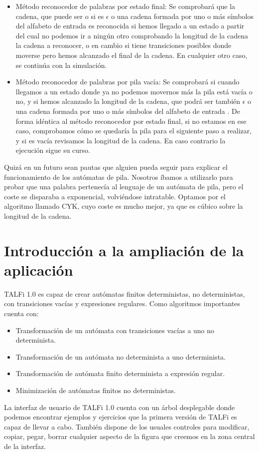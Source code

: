 \documentclass[12pt,a4paper,spanish]{book}
\begin{document}
\begin{itemize}

\item M\'etodo reconocedor de palabras por estado final: Se comprobar\'a que la cadena, que puede ser o si es $\epsilon$ o una cadena formada por uno o m\'as s\'imbolos del alfabeto de entrada es reconocida si hemos llegado a un estado a partir del cual no podemos ir a ning\'un otro comprobando la longitud de la cadena la cadena a reconocer, o en cambio si tiene transiciones posibles donde moverse pero hemos alcanzado el final de la cadena. En cualquier otro caso, se contin\'ua con la simulaci\'on.

\item M\'etodo reconocedor de palabras por pila vac\'ia: Se comprobar\'a si cuando llegamos a un estado donde ya no podemos movernos m\'as la pila est\'a vac\'ia o no, y si hemos alcanzado la longitud de la cadena, que podr\'a ser tambi\'en $\epsilon$ o una cadena formada por uno o m\'as s\'imbolos del alfabeto de entrada . De forma id\'entica al m\'etodo reconocedor por estado final, si no estamos en ese caso, comprobamos c\'omo se quedar\'ia la pila para el siguiente paso a realizar, y si es vac\'ia revisamos la longitud de la cadena. En caso contrario la ejecuci\'on sigue su curso.

\end{itemize}

Quiz\'a en un futuro sean pautas que alguien pueda seguir para explicar el funcionamiento de los aut\'omatas de pila. Nosotros \'ibamos a utilizarlo para probar que una palabra pertenec\'ia al lenguaje de un aut\'omata de pila, pero el coste se disparaba a exponencial, volvi\'endose intratable. Optamos por el algoritmo llamado CYK, cuyo coste es mucho mejor, ya que es c\'ubico sobre la longitud de la cadena.

\section{Introducci\'on a la ampliaci\'on de la aplicaci\'on}


TALFi 1.0 es capaz de crear aut\'omatas finitos deterministas, no deterministas, con transiciones vac\'ias y expresiones regulares.
Como algoritmos importantes cuenta con:
\begin{itemize}
\item Transformaci\'on de un aut\'omata con transiciones vac\'ias a uno no determinista.
\item Transformaci\'on de un aut\'omata no determinista a uno determinista.
\item Transformaci\'on de aut\'omata finito determinista a expresi\'on regular.
\item Minimizaci\'on de aut\'omatas finitos no deterministas.\\
\end{itemize}
La interfaz de usuario de TALFi 1.0 cuenta con un \'arbol desplegable donde podemos encontrar ejemplos y ejercicios que la primera versi\'on de TALFi es capaz de llevar a cabo. Tambi\'en dispone de los usuales controles para modificar, copiar, pegar, borrar cualquier aspecto de la figura que creemos en la zona central de la interfaz.
\end{document}
